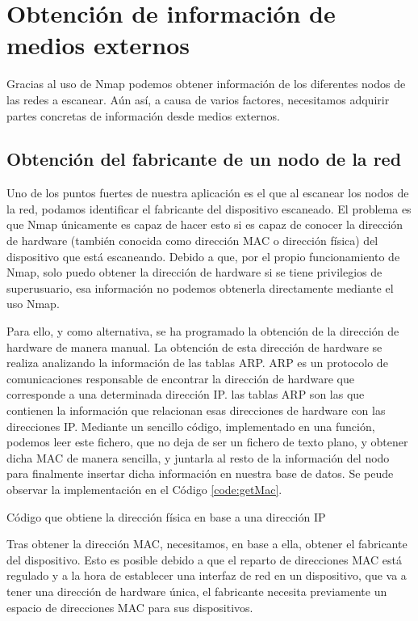 \section{Obtención de información de medios externos}

Gracias al uso de Nmap podemos obtener información de los diferentes nodos de las redes a escanear. Aún así, a causa de varios factores, necesitamos adquirir partes concretas de información desde medios externos.

\subsection{Obtención del fabricante de un nodo de la red}

Uno de los puntos fuertes de nuestra aplicación es el que al escanear los nodos de la red, podamos identificar el fabricante del dispositivo escaneado. El problema es que Nmap únicamente es capaz de hacer esto si es capaz de conocer la dirección de hardware (también conocida como dirección MAC o dirección física) del dispositivo que está escaneando. Debido a que, por el propio funcionamiento de Nmap, solo puedo obtener la dirección de hardware si se tiene privilegios de superusuario, esa información no podemos obtenerla directamente mediante el uso Nmap.

Para ello, y como alternativa, se ha programado la obtención de la dirección de hardware de manera manual. La obtención de esta dirección de hardware se realiza analizando la información de las tablas ARP. ARP es un protocolo de comunicaciones responsable de encontrar la dirección de hardware que corresponde a una determinada dirección IP.  las tablas ARP son las que contienen la información que relacionan esas direcciones de hardware con las direcciones IP. Mediante un sencillo código, implementado en una función, podemos leer este fichero, que no deja de ser un fichero de texto plano, y obtener dicha MAC de manera sencilla, y juntarla al resto de la información del nodo para finalmente insertar dicha información en nuestra base de datos. Se peude observar la implementación en el Código \ref{code:getMac}.

\begin{code}
	\caption{Código que obtiene la dirección física en base a una dirección IP}
	\label{code:getMac}
	
\end{code}

Tras obtener la dirección MAC, necesitamos, en base a ella, obtener el fabricante del dispositivo. Esto es posible debido a que el reparto de direcciones MAC está regulado y a la hora de establecer una interfaz de red en un dispositivo, que va a tener una dirección de hardware única, el fabricante necesita previamente un espacio de direcciones MAC para sus dispositivos.

